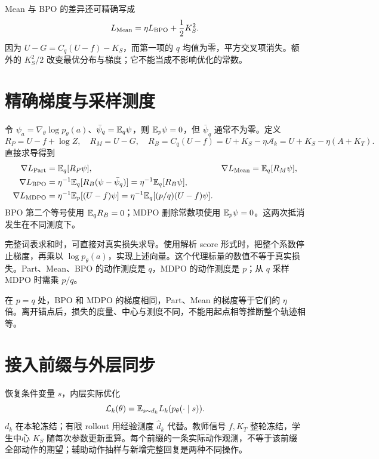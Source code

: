 Mean 与 BPO 的差异还可精确写成
\begin{equation}
L_{\rm Mean}=\eta L_{\rm BPO}+\frac12K_S^2.
\label{eq:mean-bpo}
\end{equation}
因为 $U-G=C_q(U-f)-K_S$，而第一项的 $q$ 均值为零，平方交叉项消失。额外的 $K_S^2/2$ 改变最优分布与梯度；它不能当成不影响优化的常数。

\section{精确梯度与采样测度}
令 $\psi_a=\nabla_\theta\log p_\theta(a)$、$\bar\psi_q=\mathbb E_q\psi$，则 $\mathbb E_p\psi=0$，但 $\bar\psi_q$ 通常不为零。定义
\begin{equation}
R_P=U-f+\log Z,\quad R_M=U-G,\quad
R_B=C_q(U-f)=U+K_S-\eta\mathcal A_k
=U+K_S-\eta(A+K_T).
\end{equation}
直接求导得到
\begin{align}
\nabla L_{\rm Part}&=\mathbb E_q[R_P\psi],&
\nabla L_{\rm Mean}&=\mathbb E_q[R_M\psi],\\
\nabla L_{\rm BPO}
&=\eta^{-1}\mathbb E_q[R_B(\psi-\bar\psi_q)]
=\eta^{-1}\mathbb E_q[R_B\psi],\label{eq:bpo-gradient}\\
\nabla L_{\rm MDPO}
&=\eta^{-1}\mathbb E_p[(U-f)\psi]
=\eta^{-1}\mathbb E_q[(p/q)(U-f)\psi].\label{eq:mdpo-gradient}
\end{align}
BPO 第二个等号使用 $\mathbb E_qR_B=0$；MDPO 删除常数项使用 $\mathbb E_p\psi=0$。这两次抵消发生在不同测度下。

完整词表求和时，可直接对真实损失求导。使用解析 score 形式时，把整个系数停止梯度，再乘以 $\log p_\theta(a)$，实现上述向量。这个代理标量的数值不等于真实损失。Part、Mean、BPO 的动作测度是 $q$，MDPO 的动作测度是 $p$；从 $q$ 采样 MDPO 时需乘 $p/q$。

在 $p=q$ 处，BPO 和 MDPO 的梯度相同，Part、Mean 的梯度等于它们的 $\eta$ 倍。离开锚点后，损失的度量、中心与测度不同，不能用起点相等推断整个轨迹相等。

\section{接入前缀与外层同步}
恢复条件变量 $s$，内层实际优化
\begin{equation}
\mathcal L_k(\theta)=\mathbb E_{s\sim d_k}L_k(p_\theta(\cdot\mid s)).
\end{equation}
$d_k$ 在本轮冻结；有限 rollout 用经验测度 $\widehat d_k$ 代替。教师信号 $f,K_T$ 整轮冻结，学生中心 $K_S$ 随每次参数更新重算。每个前缀的一条实际动作观测，不等于该前缀全部动作的期望；辅助动作抽样与新增完整回复是两种不同操作。

